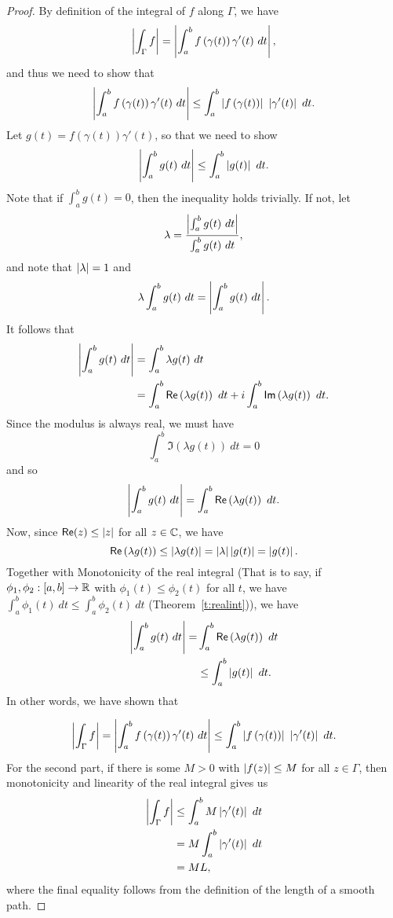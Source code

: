 \begin{proof}
By definition of the integral of $f$ along $\Gamma$, we have
\[
\left|  \int_{\Gamma} f  \right| = \left|  \int_a^b f \left( \gamma(t) \right) \gamma' (t)\ dt  \right|,
\]
and thus we need to show that
\[
\left|  \int_a^b f \left( \gamma (t) \right) \gamma'(t)\ dt  \right| \leq \int_a^b \left|  f \left( \gamma (t) \right)  \right|\ \left|  \gamma'(t)  \right|\ dt.
\]
Let $g(t)=f(\gamma(t))\gamma'(t)$, so that we need to show
\[
\abs{\int_a^b g(t)\ dt } \leq \int_a^b \abs{g(t)}\ dt.
\]
Note that if $\int_a^b g(t) = 0$, then the inequality holds trivially.  If not, let
\[
\lambda = \frac{\left| \int_a^b g(t)\ dt \right|}{\int_a^b g(t)\ dt},
\]
and note that $\left| \lambda \right| = 1$ and
\[
\lambda \int_a^b g(t)\ dt = \abs{ \int_a^b g(t)\ dt }.
\]
It follows that
\begin{align*}
\left| \int_a^b g(t)\ dt  \right| &= \int_a^b \lambda g(t)\ dt  \\
& = \int_a^b \textsf{Re} \left( \lambda g(t) \right)\ dt + i \int_a^b \textsf{Im} \left( \lambda g(t) \right)\ dt.
\end{align*}
Since the modulus is always real, we must have
\[
\int_a^b \Im \left( \lambda g(t) \right)\ dt =0
\]
and so
\[
\left| \int_a^b g(t)\ dt  \right| = \int_a^b \textsf{Re} \left( \lambda g(t) \right)\ dt.
\]
Now, since $\textsf{Re} (z) \leq \left| z \right|$ for all $z \in \mathbb{C}$, we have
\[
\textsf{Re} \left( \lambda g(t) \right) \leq \left| \lambda g(t)  \right| = \left| \lambda \right| \left| g(t) \right| = \left| g(t) \right|.
\]
Together with Monotonicity of the real integral (That is to say, if $\phi_1,\phi_2:[a,b] \to \mathbb{R} $ with $\phi_1(t) \leq \phi_2 (t)$ for all $t$, we have $\int_a^b \phi_1(t)\ dt \leq \int_a^b \phi_2 (t)\ dt$ (Theorem~\ref{t:realint})), we have
\begin{align*}
\left|  \int_a^b g(t)\ dt  \right| =&  \int_a^b \textsf{Re} \left( \lambda g(t) \right)\ dt \\
& \leq \int_a^b \left| g(t) \right|\ dt.
\end{align*}
In other words, we have shown that

\[
\left| \int_{\Gamma} f  \right| = \left|  \int_a^b f \left( \gamma (t) \right) \gamma'(t)\ dt  \right| \leq \int_a^b \left|  f \left( \gamma (t) \right)  \right|\ \left|  \gamma'(t)  \right|\ dt.
\]
  For the second part, if there is some $M>0$ with $\left| f(z) \right| \leq M$ for all $z \in \Gamma$, then monotonicity and linearity of the real integral gives us
  \begin{align*}
  \left| \int_{\Gamma} f  \right| & \leq \int_a^b M \left|  \gamma ' (t)  \right| \ dt \\
  & = M \int_a^b \left| \gamma ' (t) \right|\ dt \\
  & = M L,
  \end{align*}
where the final equality follows from the definition of the length of a smooth path.
\end{proof}

